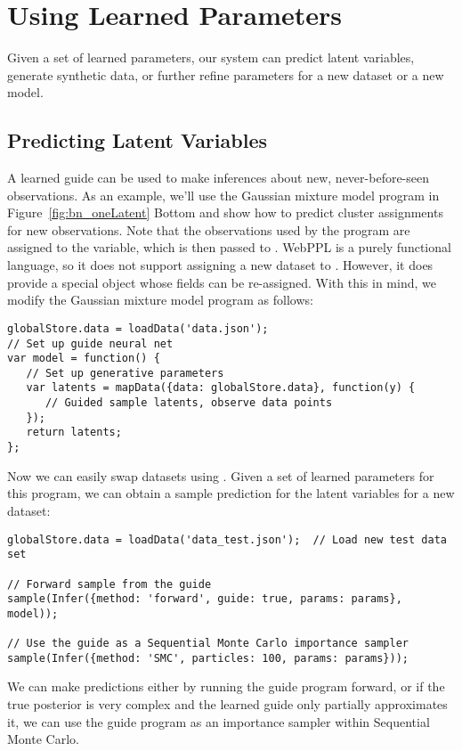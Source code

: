\section{Using Learned Parameters}
\label{sec:usingLearnedGuides}

Given a set of learned parameters, our system can predict latent variables, generate synthetic data, or further refine parameters for a new dataset or a new model.

\subsection{Predicting Latent Variables}

A learned guide can be used to make inferences about new, never-before-seen observations. As an example, we'll use the Gaussian mixture model program in Figure~\ref{fig:bn_oneLatent} Bottom and show how to predict cluster assignments for new observations. Note that the observations used by the program are assigned to the  variable, which is then passed to . WebPPL is a purely functional language, so it does not support assigning a new dataset to . However, it does provide a special  object whose fields can be re-assigned. With this in mind, we modify the Gaussian mixture model program as follows:
\begin{lstlisting}
globalStore.data = loadData('data.json');
// Set up guide neural net
var model = function() {
   // Set up generative parameters
   var latents = mapData({data: globalStore.data}, function(y) {
      // Guided sample latents, observe data points
   });
   return latents;
};
\end{lstlisting}
Now we can easily swap datasets using . Given a set of learned parameters  for this program, we can obtain a sample prediction for the latent variables for a new dataset:
\begin{lstlisting}
globalStore.data = loadData('data_test.json');	// Load new test data set

// Forward sample from the guide
sample(Infer({method: 'forward', guide: true, params: params}, model));

// Use the guide as a Sequential Monte Carlo importance sampler
sample(Infer({method: 'SMC', particles: 100, params: params}));
\end{lstlisting}
We can make predictions either by running the guide program forward, or if the true posterior is very complex and the learned guide only partially approximates it, we can use the guide program as an importance sampler within Sequential Monte Carlo.

